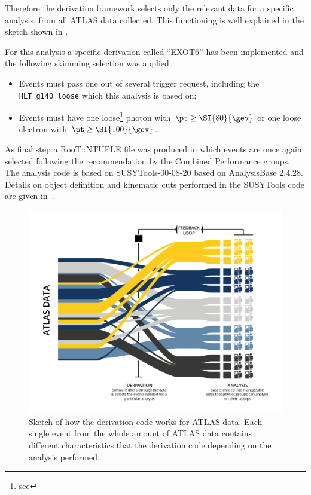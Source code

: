 Therefore the derivation framework selects only the relevant data for a specific analysis, from all ATLAS data collected. This functioning is well explained in the sketch shown in \Fig{\ref{fig:derivation}}.

For this analysis a specific derivation called ``EXOT6'' has been implemented and the following skimming selection was applied:
\begin{itemize}
\item Events must pass one out of several trigger request, including the \verb!HLT_g140_loose! which this analysis is based on;
\item Events must have one loose\footnote{see \Sect{\ref{photons}}} photon with $\pt\ge\SI{80}{\gev}$ or one loose electron with $\pt\ge\SI{100}{\gev}$.
\end{itemize}

As final step a RooT::NTUPLE file was produced in which events are once again selected following the recommendation by the Combined Performance groups. The analysis code is based on SUSYTools-00-08-20 based on AnalysisBase 2.4.28. Details on object definition and kinematic cuts performed in the SUSYTools code are given in~\cite{twiki:SUSYTools}.


\begin{figure}[t]
\centering
\includegraphics[width=.5\textwidth]{MCSample/Derivation}
\caption{Sketch of how the derivation code works for ATLAS data. Each single event from the whole amount of ATLAS data contains different characteristics that the derivation code depending on the analysis performed.}
\label{fig:derivation}
\end{figure}















